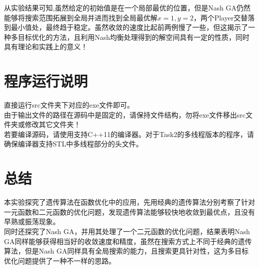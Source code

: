 \documentclass[UTF8]{ctexart}
\begin{document}
\indent 从实验结果可知,虽然给定的初始值是在一个局部最优的位置，但是Nash GA仍然能够将搜索范围拓展到全局并进而找到全局最优解$x=1,y=2$，两个Player交替落到最小值处，最终趋于稳定。虽然收敛的速度比起前两例慢了一些，但这揭示了一种多目标优化的方法，且利用Nash均衡处理得到的解空间具有一定的性质，同时具有理论和实践上的意义！

\section{程序运行说明}
直接运行src文件夹下对应的exe文件即可。\\
\indent 由于输出文件的路径在源码中是固定的，请保持文件结构，勿将exe文件移出src文件夹或修改其它文件夹！\\
\indent 若要编译源码，请使用支持C++11的编译器。对于Task2的多线程版本的程序，请确保编译器支持STL中多线程部分的头文件。

\section{总结}
本实验探究了遗传算法在函数优化中的应用，先用经典的遗传算法分别考察了针对一元函数和二元函数的优化问题，发现遗传算法能够较快地收敛到最优点，且没有早熟或振荡现象。\\
\indent 同时还探究了Nash GA，并用其处理了一个二元函数的优化问题，结果表明Nash GA同样能够获得相当好的收敛速度和精度，虽然在搜索方式上不同于经典的遗传算法，但是Nash GA同样具有全局搜索的能力，且搜索更具针对性，这为多目标优化问题提供了一种不一样的思路。
\end{document}
